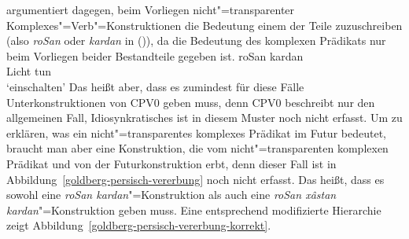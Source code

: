 \citet[--140]{Goldberg2003a} %
argumentiert dagegen, beim Vorliegen nicht"=transparenter Komplexes"=Verb"=Konstruktionen die Bedeutung
einem der Teile zuzuschreiben (also \emph{roSan} oder \emph{kardan} in ()),
da die Bedeutung des komplexen Prädikats nur beim Vorliegen beider Bestandteile gegeben ist. 
\ea
\gll roSan kardan\\
     Licht tun\\\nopagebreak
\glt `einschalten'
\z
Das heißt aber, dass es zumindest für diese Fälle Unterkonstruktionen von CPV0 geben muss,
denn CPV0 beschreibt nur den allgemeinen Fall, Idiosynkratisches ist in diesem Muster noch nicht erfasst.
Um zu erklären, was ein nicht"=transparentes komplexes Prädikat im Futur bedeutet, braucht man aber
eine Konstruktion, die vom nicht"=transparenten komplexen Prädikat und von der Futurkonstruktion erbt,
denn dieser Fall ist in Abbildung~\ref{goldberg-persisch-vererbung} noch nicht erfasst. Das heißt,
dass es sowohl eine \emph{roSan kardan}"=Konstruktion als auch eine \emph{roSan x{\^a}stan kardan}"=Konstruktion
geben muss. Eine entsprechend modifizierte Hierarchie zeigt Abbildung~\vref{goldberg-persisch-vererbung-korrekt}.
